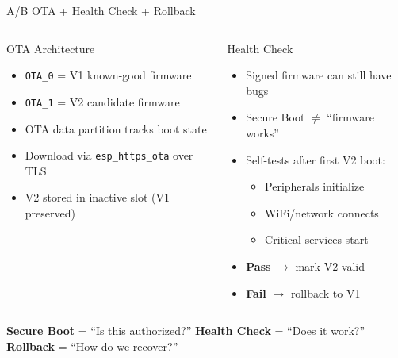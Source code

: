\documentclass[aspectratio=169]{beamer}
\begin{document}
\begin{frame}{A/B OTA + Health Check + Rollback}

\begin{columns}[T]
\begin{block}{OTA Architecture}
\begin{itemize}\small
  \item \texttt{OTA\_0} = V1 known-good firmware
  \item \texttt{OTA\_1} = V2 candidate firmware
  \item OTA data partition tracks boot state
  \item Download via \texttt{esp\_https\_ota} over TLS
  \item V2 stored in inactive slot (V1 preserved)
\end{itemize}
\end{block}

\begin{block}{Health Check}
\begin{itemize}\small
  \item Signed firmware can still have bugs
  \item Secure Boot $\neq$ ``firmware works''
  \item Self-tests after first V2 boot:
    \begin{itemize}\scriptsize
      \item Peripherals initialize
      \item WiFi/network connects
      \item Critical services start
    \end{itemize}
  \item \textbf{Pass} $\rightarrow$ mark V2 valid
  \item \textbf{Fail} $\rightarrow$ rollback to V1
\end{itemize}
\end{block}
\end{columns}

\vspace{6pt}
\centering
{\small\textbf{Secure Boot} = ``Is this authorized?'' \quad\textbf{Health Check} = ``Does it work?'' \quad\textbf{Rollback} = ``How do we recover?''}

\end{frame}
\end{document}
